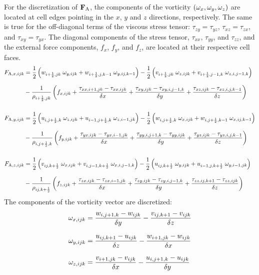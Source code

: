 For the discretization of ${\mathbf{F}}_{\rm A}$, the components of the vorticity $(\omega_x,\omega_y,\omega_z)$ are located at cell edges pointing in the $x$, $y$ and $z$ directions, respectively. The same is true for the off-diagonal terms of the viscous stress tensor: $\tau_{zy}=\tau_{yz}$, $\tau_{xz}=\tau_{zx}$, and $\tau_{xy}=\tau_{yx}$. The diagonal components of the stress tensor, $\tau_{xx}$, $\tau_{yy}$, and $\tau_{zz}$, and the external force components, $f_x$, $f_y$, and $f_z$, are located at their respective cell faces.
\begin{align}
F_{{\rm A},x,ijk} &= \frac{1}{2} \left( w_{i+\frac{1}{2},jk} \; \omega_{y,ijk} + w_{i+\frac{1}{2},j,k-1} \; \omega_{y,ij,k-1} \right) - \frac{1}{2} \left( v_{i+\frac{1}{2},jk} \; \omega_{z,ijk} + v_{i+\frac{1}{2},j-1,k} \; \omega_{z,i,j-1,k} \right) \nonumber\\[.1in]
           &  - \frac{1}{\rho_{i+\frac{1}{2},jk}} \left( f_{x,ijk} + \frac{\tau_{xx,i+1,jk}-\tau_{xx,ijk}}{\delta x} + \frac{\tau_{xy,ijk}-\tau_{xy,i,j-1,k}}{\delta y} + \frac{\tau_{xz,ijk}-\tau_{xz,i,j,k-1}}{\delta z}  \right)  \\[.2in]
F_{{\rm A},y,ijk} &= \frac{1}{2} \left( u_{i,j+\frac{1}{2},k} \; \omega_{z,ijk} + u_{i-1,j+\frac{1}{2},k} \; \omega_{z,i-1,jk} \right) - \frac{1}{2} \left( w_{i,j+\frac{1}{2},k} \; \omega_{x,ijk} + w_{i,j+\frac{1}{2},k-1} \; \omega_{x,ij,k-1} \right) \nonumber \\[.1in]
           &  - \frac{1}{\rho_{i,j+\frac{1}{2},k}} \left( f_{y,ijk} + \frac{\tau_{yx,ijk}-\tau_{yx,i-1,jk}}{\delta x} + \frac{\tau_{yy,i,j+1,k}-\tau_{yy,ijk}}{\delta y} + \frac{\tau_{yz,ijk}-\tau_{yz,i,j,k-1}}{\delta z} \right) \\[.2in]
F_{{\rm A},z,ijk} &=  \frac{1}{2} \left( v_{ij,k+\frac{1}{2}} \; \omega_{x,ijk} + v_{i,j-1,k+\frac{1}{2}} \; \omega_{x,i,j-1,k} \right) -\frac{1}{2} \left( u_{ij,k+\frac{1}{2}} \; \omega_{y,ijk} + u_{i-1,j,k+\frac{1}{2}} \; \omega_{y,i-1,jk} \right) \nonumber \\[.1in]
           &  - \frac{1}{\rho_{ij,k+\frac{1}{2}}} \left( f_{z,ijk} + \frac{\tau_{zx,ijk}-\tau_{zx,i-1,jk}}{\delta x} + \frac{\tau_{zy,ijk}-\tau_{zy,i,j-1,k}}{\delta y} + \frac{\tau_{zz,ij,k+1}-\tau_{zz,ijk}}{\delta z} \right)
\end{align}
The components of the vorticity vector are discretized:
\begin{align}
\omega_{x,ijk} &= \frac{w_{i,j+1,k}-w_{ijk}}{\delta y} - \frac{v_{ij,k+1}-v_{ijk}}{ \delta z}  \\[.1in]
\omega_{y,ijk} &= \frac{u_{ij,k+1}-u_{ijk}}{\delta z} - \frac{w_{i+1,jk}-w_{ijk}}{\delta x}  \\[.1in]
\omega_{z,ijk} &= \frac{v_{i+1,jk}- v_{ijk}}{\delta x} -\frac{u_{i,j+1,k}-u_{ijk}}{ \delta y}
\end{align}
